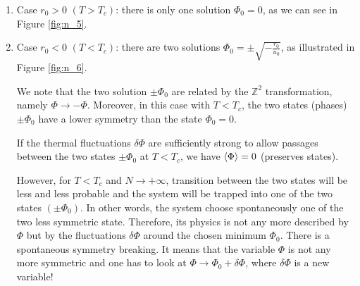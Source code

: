 \documentclass[../../Main/Main.tex]{subfiles}
\begin{document}
\begin{enumerate}
\item Case \( r_0>0 \) \( (T>T_c) \): there is only one solution \( \Phi _0 =0 \), as we can see in Figure \ref{fig:n_5}.

\item Case \( r_0<0 \) \( (T<T_c) \): there are two solutions \( \Phi _0 = \pm \sqrt{-\frac{r_0}{u_0}}  \), as illustrated in Figure \ref{fig:n_6}.

We note that the two solution \( \pm \Phi _0 \) are related by the \( \mathbb{Z}^2 \) transformation, namely \( \Phi \rightarrow - \Phi  \).
Moreover, in this case with \( T < T_c \), the two states (phases) \( \pm \Phi _0 \) have a lower symmetry than the state \( \Phi _0 = 0 \).

If the thermal fluctuations \( \delta \Phi  \) are sufficiently strong to allow passages between the two states \( \pm \Phi _0 \) at \( T < T_c \), we have \( \expval{\Phi } = 0  \) (preserves states).


However, for \( T < T_c \) and \( N \rightarrow + \infty  \), transition between the two states will be less and less probable and the system will be trapped into one of the two states \( (\pm \Phi _0) \). In other words, the system choose spontaneously one of the two less symmetric state. Therefore, its physics is not any more described by \( \Phi  \) but by the fluctuations \( \delta \Phi  \) around the chosen minimum \( \Phi _0 \). There is a spontaneous symmetry breaking. It means that the variable \( \Phi  \) is not any more symmetric and one has to look at \( \Phi \rightarrow \Phi _0 + \delta \Phi  \), where \( \delta \Phi  \) is a new variable!

\end{enumerate}
\end{document}
